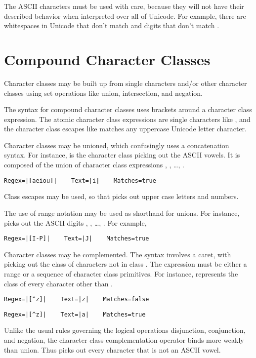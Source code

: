 The ASCII characters must be used with care, because they will not
have their described behavior when interpreted over all of Unicode.
For example, there are whitespaces in Unicode that don't match
 and digits that don't match .

\section{Compound Character Classes}\label{section:compound-char-classes}

Character classes may be built up from single characters and/or other
character classes using set operations like union, intersection, and
negation.

The syntax for compound character classes uses brackets around a
character class expression.  The atomic character class expressions
are single characters like , and the character class escapes
like  matches any uppercase Unicode letter character.

Character classes may be unioned, which confusingly uses a
concatenation syntax.  For instance, \code{[aeiou]} is the character
class picking out the ASCII vowels.  It is composed of the union of
character class expressions , , \ldots, .  
%
\begin{verbatim}
Regex=|[aeiou]|    Text=|i|    Matches=true
\end{verbatim}
%
Class escapes may be used, so that \code{[{\bk}p\{Lu\}{\bk}p\{N\}]}
picks out upper case letters and numbers.

The use of range notation may be used as shorthand for unions.
For instance, \code{[0-9]} picks out the ASCII digits ,
, \ldots, .  For example,
%
\begin{verbatim}
Regex=|[I-P]|    Text=|J|    Matches=true
\end{verbatim}

Character classes may be complemented.  The syntax involves a caret,
with \code{[\^{}\codeVar{A}]} picking out the class of characters not
in class .  The expression  must be either a
range or a sequence of character class primitives.  For instance,
\code{[\^{}z]} represents the class of every character other than
.  
%
\begin{verbatim}
Regex=|[^z]|    Text=|z|    Matches=false
\end{verbatim}
%
\begin{verbatim}
Regex=|[^z]|    Text=|a|    Matches=true
\end{verbatim}
%
Unlike the usual rules governing the logical operations disjunction,
conjunction, and negation, the character class complementation
operator binds more weakly than union.  Thus \code{[\^{}aeiou]} picks
out every character that is not an ASCII vowel.

